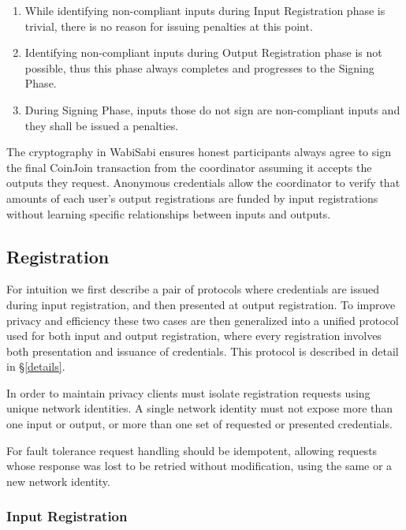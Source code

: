 \documentclass{article}
\begin{document}
\begin{enumerate}
    \item While identifying non-compliant inputs during Input Registration phase is trivial, there is no reason for issuing penalties at this point.
    \item Identifying non-compliant inputs during Output Registration phase is not possible, thus this phase always completes and progresses to the Signing Phase.
    \item During Signing Phase, inputs those do not sign are non-compliant inputs and they shall be issued a penalties.
\end{enumerate}

The cryptography in WabiSabi ensures honest participants always agree to sign the final CoinJoin transaction from the coordinator assuming it accepts the outputs they request. Anonymous credentials allow the coordinator to verify that amounts of each user's output registrations are funded by input registrations without learning specific relationships between inputs and outputs.

\subsection{Registration}

For intuition we first describe a pair of protocols where credentials are issued during input registration, and then presented at output registration. To improve privacy and efficiency these two cases are then generalized into a unified protocol used for both input and output registration, where every registration involves both presentation and issuance of credentials. This protocol is described in detail in \S\ref{details}.

In order to maintain privacy clients must isolate registration requests using unique network identities. A single network identity must not expose more than one input or output, or more than one set of requested or presented credentials.

For fault tolerance request handling should be idempotent, allowing requests whose response was lost to be retried without modification, using the same or a new network identity.

\subsubsection{Input Registration}
\end{document}
